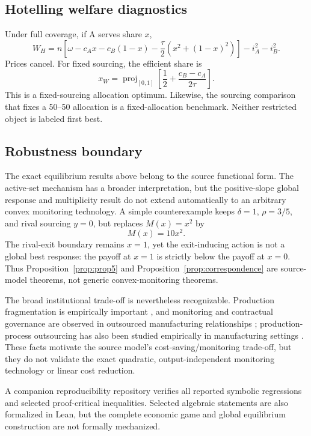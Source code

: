 \subsection{Hotelling welfare diagnostics}

Under full coverage, if A serves share \(x\),
\begin{equation}
W_H
=
n\left[
\omega-c_Ax-c_B(1-x)
-\frac{\tau}{2}\left(x^2+(1-x)^2\right)
\right]
-i_A^2-i_B^2 .
\label{eq:WH}
\end{equation}
Prices cancel.  For fixed sourcing, the efficient share is
\[
x_W=
\operatorname{proj}_{[0,1]}
\left[
\frac12+\frac{c_B-c_A}{2\tau}
\right].
\]
This is a fixed-sourcing allocation optimum.  Likewise, the sourcing comparison that fixes a 50--50 allocation is a fixed-allocation benchmark.  Neither restricted object is labeled first best.

\subsection{Robustness boundary}

The exact equilibrium results above belong to the source functional form.  The active-set mechanism has a broader interpretation, but the positive-slope global response and multiplicity result do not extend automatically to an arbitrary convex monitoring technology.  A simple counterexample keeps \(\delta=1\), \(\rho=3/5\), and rival sourcing \(y=0\), but replaces \(M(x)=x^2\) by
\[
M(x)=10x^2.
\]
The rival-exit boundary remains \(x=1\), yet the exit-inducing action is not a global best response: the payoff at \(x=1\) is strictly below the payoff at \(x=0\).  Thus Proposition~\ref{prop:prop5} and Proposition~\ref{prop:correspondence} are source-model theorems, not generic convex-monitoring theorems.

The broad institutional trade-off is nevertheless recognizable.  Production fragmentation is empirically important \cite{Fort2017}, and monitoring and contractual governance are observed in outsourced manufacturing relationships \cite{HandleyGray2013}; production-process outsourcing has also been studied empirically in manufacturing settings \cite{BardhanWhitakerMithas2006}.  These facts motivate the source model's cost-saving/monitoring trade-off, but they do not validate the exact quadratic, output-independent monitoring technology or linear cost reduction.

A companion reproducibility repository verifies all reported symbolic regressions and selected proof-critical inequalities.  Selected algebraic statements are also formalized in Lean, but the complete economic game and global equilibrium construction are not formally mechanized.
